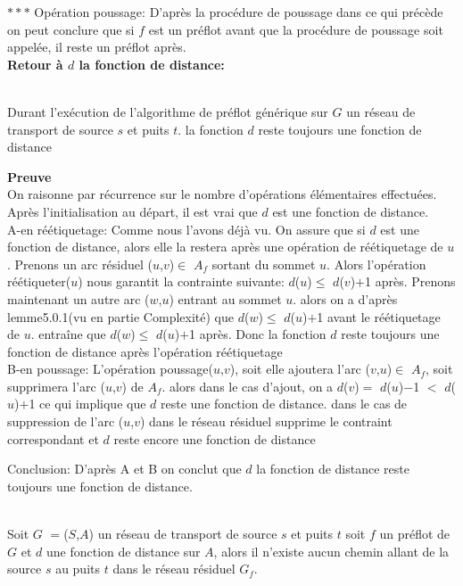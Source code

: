 $***$ Opération poussage:
D'après la procédure de poussage dans ce qui précède on peut conclure que
si $f$ est un préflot avant que la procédure de poussage soit appelée, il reste un préflot après.\\

\textbf{Retour à $d$ la fonction de distance:}\\
\begin{lemma} ~\\
	\label{residual_path}Durant l'exécution de l'algorithme de préflot générique sur $G$ un réseau de transport de source $s$ et puits $t$. la fonction $d$ reste toujours une fonction de distance
\end{lemma}  
\textbf{Preuve} \\
  On raisonne par récurrence sur le nombre d'opérations élémentaires effectuées.
  Après l'initialisation au départ, il est vrai que $d$ est une fonction de distance.\\
  
  A-en réétiquetage:
  Comme nous l'avons déjà vu.
  On assure que si $d$ est une fonction de distance, alors elle la restera après une opération de réétiquetage de $u$.
  Prenons un arc résiduel ($u$,$v$)$\in$ $A_f$  sortant du sommet $u$.
  Alors l'opération réétiqueter($u$) nous garantit la contrainte suivante:
  $d$($u$)$\leq$ $d$($v$)$+$1 après.
  Prenons maintenant un autre arc ($w$,$u$) entrant au sommet $u$. alors on a d'après lemme5.0.1(vu en partie Complexité) que $d$($w$)$\leq$ $d$($u$)$+$1 avant le réétiquetage de $u$. entraîne que $d$($w$)$\leq$ $d$($u$)$+$1 après. Donc la fonction $d$ reste toujours une fonction de distance après l'opération réétiquetage\\
  
  B-en poussage:
  L'opération poussage($u$,$v$), soit elle ajoutera l'arc ($v$,$u$)$\in$ $A_f$, soit supprimera l'arc ($u$,$v$) de $A_f$. alors dans le cas d'ajout, on a $d$($v$)$=$ $d$($u$)$-$1 $<$ $d$($u$)$+$1 ce qui implique que $d$ reste une fonction de distance. dans le cas de suppression de l'arc ($u$,$v$) dans le réseau résiduel supprime le contraint correspondant et $d$ reste encore une fonction de distance 
 
 Conclusion:
  D'après A et B on conclut que $d$ la fonction de distance reste toujours une fonction de distance.
  \\
   
\begin{lemma} ~\\
	\label{borne_reetiq}Soit $G$ $=$($S$,$A$) un réseau de transport de source $s$ et puits $t$ soit $f$ un préflot de $G$ et $d$ une fonction de distance sur $A$, alors il n'existe aucun chemin allant de la source $s$ au puits $t$ dans le réseau résiduel $G_f$.
\end{lemma} 

